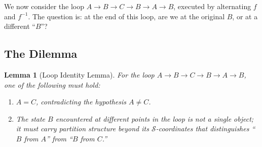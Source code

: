 \documentclass[twocolumn,10pt,a4paper]{article}
\newtheorem{lemma}[theorem]{Lemma}
\theoremstyle{definition}
\theoremstyle{remark}
\newcommand{\StateSpace}{\mathcal{S}}
\begin{document}
We now consider the loop $A \to B \to C \to B \to A \to B$, executed by alternating $f$ and $f^{-1}$. The question is: at the end of this loop, are we at the original $B$, or at a different ``$B$''?

\subsection{The Dilemma}

\begin{lemma}[Loop Identity Lemma]
\label{lem:loop}
For the loop $A \to B \to C \to B \to A \to B$, one of the following must hold:
\begin{enumerate}[leftmargin=1.5em,itemsep=0.2em]
    \item[(i)] $A = C$, contradicting the hypothesis $A \neq C$.
    \item[(ii)] The state $B$ encountered at different points in the loop is not a single object; it must carry partition structure beyond its $\StateSpace$-coordinates that distinguishes ``$B$ from $A$'' from ``$B$ from $C$.''
\end{enumerate}
\end{lemma}
\end{document}
